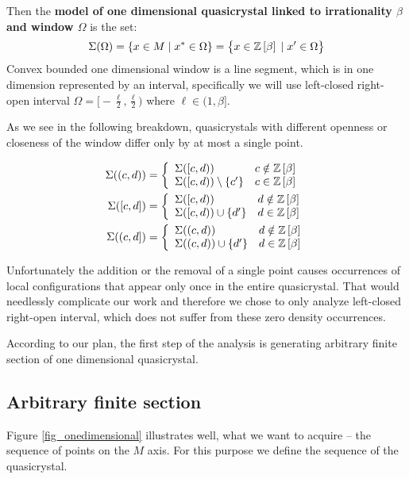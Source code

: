 \documentclass[text.tex]{subfiles}
\begin{document}
Then the \textbf{model of one dimensional quasicrystal linked to irrationality $\beta$ and window $\Omega$} is the set:
$$\Sigma(\Omega) = \{ x \in M\; |\; x^\ast\in \Omega\} = \big\{ x \in \mathbb{Z}\left[\beta\right]\; |\; x'\in \Omega\big\}$$
Convex bounded one dimensional window is a line segment, which is in one dimension represented by an interval, specifically we will use left-closed right-open interval $\Omega = \big[-\frac{\ell}{2}, \frac{\ell}{2}\big)$ where $\ell\in (1,\beta]$. 

As we see in the following breakdown, quasicrystals with different openness or closeness of the window differ only by at most a single point. 

\begin{align*}
\Sigma((c,d)) &= \left\{ 
	\begin{array}{l l}
	\Sigma([c,d)) & c \notin \mathbb{Z}\left[\beta\right]\\
	\Sigma([c,d))\setminus\{c'\} & c \in \mathbb{Z}\left[\beta\right]
	\end{array} \right. 
  \\
  \Sigma([c,d]) &= \left\{ 
	\begin{array}{l l}
	\Sigma([c,d)) & d \notin \mathbb{Z}\left[\beta\right]\\
	\Sigma([c,d))\cup\{d'\} & d \in \mathbb{Z}\left[\beta\right]
	\end{array} \right.
  \\
\Sigma((c,d]) &= \left\{ 
	\begin{array}{l l}
	\Sigma((c,d)) & d \notin \mathbb{Z}\left[\beta\right]\\
	\Sigma((c,d))\cup\{d'\} & d \in \mathbb{Z}\left[\beta\right]
	\end{array} \right.\\
\end{align*}

Unfortunately the addition or the removal of a single point causes occurrences of local configurations that appear only once in the entire quasicrystal. That would needlessly complicate our work and therefore we chose to only analyze left-closed right-open interval, which does not suffer from these zero density occurrences. 

According to our plan, the first step of the analysis is generating arbitrary finite section of one dimensional quasicrystal. 

\subsection{Arbitrary finite section}\label{sec_1DfiniteSection}
Figure \ref{fig_onedimensional} illustrates well, what we want to acquire -- the sequence of points on the $M$ axis. For this purpose we define the sequence of the quasicrystal. 
\end{document}
